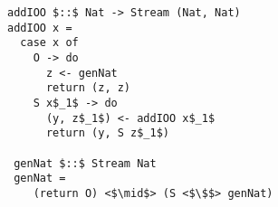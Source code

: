 \begin{figure}[h]
\centering
\begin{minipage}{0.9\columnwidth}
  \begin{lstlisting}[frame=tb, language=ocanren1]
addIOO $::$ Nat -> Stream (Nat, Nat)
addIOO x =
  case x of
    O -> do
      z <- genNat
      return (z, z)
    S x$_1$ -> do
      (y, z$_1$) <- addIOO x$_1$
      return (y, S z$_1$)

 genNat $::$ Stream Nat
 genNat = 
    (return O) <$\mid$> (S <$\$$> genNat)
  \end{lstlisting}
\end{minipage}
\end{figure}
